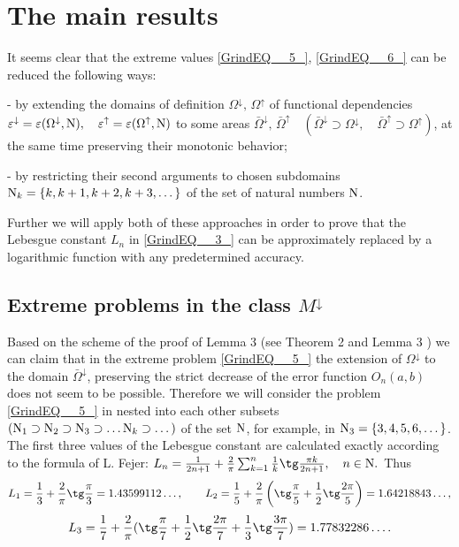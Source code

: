 \documentclass[
11pt,%
tightenlines,%
twoside,%
onecolumn,%
nofloats,%
nobibnotes,%
nofootinbib,%
superscriptaddress,%
noshowpacs,%
centertags]%
{revtex4}
\begin{document}
\section{The main results}

It seems clear that the extreme values \eqref{GrindEQ__5_}, \eqref{GrindEQ__6_} can be reduced the following ways:

- by extending the domains of definition $\Omega ^{\downarrow }, \, \Omega ^{\uparrow } $ of functional dependencies $\varepsilon ^{\downarrow }  = \varepsilon (\Omega ^{\downarrow } , {\rm N} ),\quad \varepsilon ^{\uparrow }  =\varepsilon (\Omega ^{\uparrow } , {\rm N} )$ to some areas $ \bar{\Omega }^{\downarrow },\, \bar{\Omega }^{\uparrow } \quad (\bar{\Omega }^{\downarrow } \supset  \Omega ^{\downarrow },\quad \bar{\Omega }^{\uparrow }  \supset  \Omega ^{\uparrow } )$,
at the same time preserving their monotonic behavior;

- by restricting their second arguments to chosen subdomains ${\rm N} _{k} = \{ k, k+1, k+2, k+3, \dots\} $ of the set of natural numbers ${\rm N}$.

Further we will apply both of these approaches in order to prove that the Lebesgue constant $L_{n}$ in \eqref{GrindEQ__3_} can be approximately replaced by a logarithmic function with any predetermined accuracy.

\subsection{Extreme problems in the class $M^{\downarrow } $}

Based on the scheme of the proof of Lemma 3 (see Theorem 2 and Lemma 3 \cite{Sh18}) we can claim that in the extreme problem \eqref{GrindEQ__5_} the extension of $\Omega ^{\downarrow } $ to the domain $\bar{\Omega }^{\downarrow } $, preserving the strict decrease  of the error function $O_{n} (a, b)$ does not seem to be possible. Therefore we will consider the problem \eqref{GrindEQ__5_} in nested into each other subsets $(  {\rm N} _{1} \supset {\rm N} _{2} \supset {\rm N} _{3} \supset \dots {\rm N} _{k} \supset   \dots)$ of the set ${\rm N} $, for example, in ${\rm N} _{3} =\{  3,   4,    5,    6,   \dots \} $. The first three values of the Lebesgue constant are calculated exactly according to the formula of L. Fejer:
$L_{n}  = \frac{1}{2n+1} + \frac{2}{\pi } \sum _{k=1}^{n}\frac{1}{k} \tg\frac{\pi  k}{2n+1},  \quad n\in {\rm N}. $
Thus
\begin{equation*}
L_{1} = \frac{1}{3} + \frac{2}{\pi } \tg\frac{\pi }{3}  = 1.43599112\dots,\qquad
L_{2} = \frac{1}{5}  + \frac{2}{\pi } \left(\tg\frac{\pi }{5}  + \frac{1}{2} \tg\frac{2\pi }{5} \right) =1.64218843\dots,
\end{equation*}
\begin{equation*}
L_{3} =\frac{1}{7}  +\frac{2}{\pi } (\tg\frac{\pi }{7}  + \frac{1}{2} \tg\frac{2\pi }{7}  + \frac{1}{3} \tg\frac{3\pi }{7} ) = 1.77832286\dots.
\end{equation*}
\end{document}

